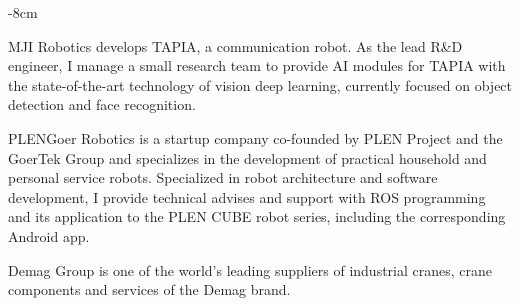 \documentclass[10pt,a4paper]{altacv}
\begin{document}

\begin{adjustwidth}{}{-8cm}
\makecvheader
\end{adjustwidth}


MJI Robotics develops TAPIA, a communication robot. As the lead R\&D engineer, I manage a small research team to provide AI modules for TAPIA with the state-of-the-art technology of vision deep learning, currently focused on object detection and face recognition. %

\divider

PLENGoer Robotics is a startup company co-founded by PLEN Project and the GoerTek Group and specializes in the development of practical household and personal service robots.
Specialized in robot architecture and software development, I provide technical advises and support with ROS programming and its application to the PLEN CUBE robot series, including the corresponding Android app.

\divider

Demag Group is one of the world's leading suppliers of industrial cranes, crane components and services of the Demag brand.
\end{document}
